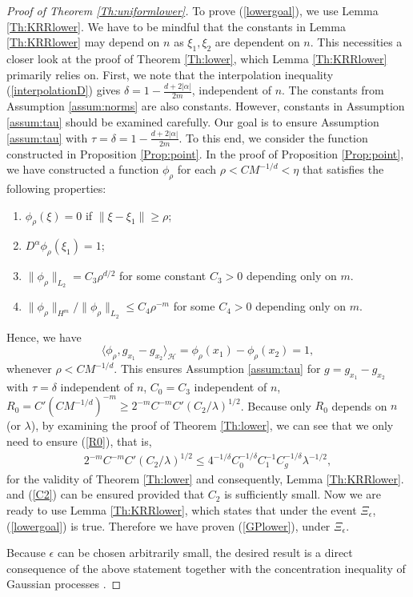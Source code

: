 \documentclass[12pt]{article}
\theoremstyle{plain}
\theoremstyle{remark}
\begin{document}
\begin{proof}[Proof of Theorem \ref{Th:uniformlower}]
    To prove (\ref{lowergoal}), we use Lemma \ref{Th:KRRlower}. We have to be mindful that the constants in Lemma \ref{Th:KRRlower} may depend on $n$ as $\xi_1,\xi_2$ are dependent on $n$. This necessities a closer look at the proof of Theorem \ref{Th:lower}, which Lemma \ref{Th:KRRlower} primarily relies on. First, we note that the interpolation inequality (\ref{interpolationD}) gives $\delta=1-\frac{d+2|\alpha|}{2m}$, independent of $n$. The constants from Assumption \ref{assum:norms} are also constants. However, constants in Assumption \ref{assum:tau} should be examined carefully. Our goal is to ensure Assumption \ref{assum:tau} with $\tau=\delta=1-\frac{d+2|\alpha|}{2m}$. To this end, we consider the function constructed in Proposition \ref{Prop:point}. In the proof of Proposition \ref{Prop:point}, we have constructed a function $\phi_\rho$ for each $\rho<C M^{-1/d}<\eta$ that satisfies the following properties:
    \begin{enumerate} [noitemsep]
        \item $\phi_\rho(\xi)=0$ if $\|\xi-\xi_1\|\geq \rho$;
        \item $D^\alpha \phi_\rho(\xi_1)=1$;
        \item $\|\phi_\rho\|_{L_2}=C_3\rho^{d/2}$ for some constant $C_3>0$ depending only on $m$.
        \item $\|\phi_\rho\|_{H^m}/\|\phi_\rho\|_{L_2}\leq C_4\rho^{-m}$ for some $C_4>0$ depending only on $m$.
    \end{enumerate}
    Hence, we have
    \[\langle \phi_\rho,g_{x_1}-g_{x_2}\rangle_\mathcal{H}=\phi_\rho(x_1)-\phi_\rho(x_2)=1,\]
    whenever $\rho<C M^{-1/d}$.
    This ensures Assumption \ref{assum:tau} for $g=g_{x_1}-g_{x_2}$ with $\tau=\delta$ independent of $n$, $C_0=C_3$ independent of $n$, $R_0=C'(C M^{-1/d})^{-m}\geq 2^{-m} C^{-m} C' (C_2/\lambda)^{1/2}$. Because only $R_0$ depends on $n$ (or $\lambda$), by examining the proof of Theorem \ref{Th:lower}, we can see that we only need to ensure (\ref{R0}), that is,
    \begin{eqnarray}\label{C2}
      2^{-m} C^{-m} C' (C_2/\lambda)^{1/2}\leq 4^{-1/\delta}C_0^{-1/\delta}C_1^{-1}C_g^{-1/\delta}\lambda^{-1/2},  
    \end{eqnarray}
    for the validity of Theorem \ref{Th:lower} and consequently, Lemma \ref{Th:KRRlower}. and (\ref{C2}) can be ensured provided that $C_2$ is sufficiently small. 
    Now we are ready to use Lemma \ref{Th:KRRlower}, which states that under the event $\Xi_\epsilon$, (\ref{lowergoal}) is true.
    Therefore we have proven (\ref{GPlower}), under $\Xi_\epsilon$.

    Because $\epsilon$ can be chosen arbitrarily small, the desired result is a direct consequence of the above statement together with the concentration inequality of Gaussian processes \citep{vershynin2018high}.
\end{proof}
\end{document}

